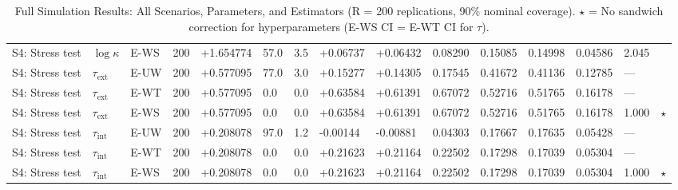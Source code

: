 \begin{table}[htbp]
\begin{tabular}{lllrlllllllllll}
  S4: Stress test & $\log\kappa$ & E-WS & 200 & +1.654774 & 57.0 & 3.5 & +0.06737 & +0.06432 & 0.08290 & 0.15085 & 0.14998 & 0.04586 & 2.045 &  \\ 
  S4: Stress test & $\tau_{\text{ext}}$ & E-UW & 200 & +0.577095 & 77.0 & 3.0 & +0.15277 & +0.14305 & 0.17545 & 0.41672 & 0.41136 & 0.12785 & --- &  \\ 
  S4: Stress test & $\tau_{\text{ext}}$ & E-WT & 200 & +0.577095 & 0.0 & 0.0 & +0.63584 & +0.61391 & 0.67072 & 0.52716 & 0.51765 & 0.16178 & --- &  \\ 
  S4: Stress test & $\tau_{\text{ext}}$ & E-WS & 200 & +0.577095 & 0.0 & 0.0 & +0.63584 & +0.61391 & 0.67072 & 0.52716 & 0.51765 & 0.16178 & 1.000 & $\star$ \\ 
  S4: Stress test & $\tau_{\text{int}}$ & E-UW & 200 & +0.208078 & 97.0 & 1.2 & -0.00144 & -0.00881 & 0.04303 & 0.17667 & 0.17635 & 0.05428 & --- &  \\ 
  S4: Stress test & $\tau_{\text{int}}$ & E-WT & 200 & +0.208078 & 0.0 & 0.0 & +0.21623 & +0.21164 & 0.22502 & 0.17298 & 0.17039 & 0.05304 & --- &  \\ 
  S4: Stress test & $\tau_{\text{int}}$ & E-WS & 200 & +0.208078 & 0.0 & 0.0 & +0.21623 & +0.21164 & 0.22502 & 0.17298 & 0.17039 & 0.05304 & 1.000 & $\star$ \\ 
   \bottomrule
\end{tabular}
\caption{Full Simulation Results: All Scenarios, Parameters, and Estimators (R = 200 replications, 90\% nominal coverage). $\star$ = No sandwich correction for hyperparameters (E-WS CI = E-WT CI for $\tau$).} 
\end{table}
